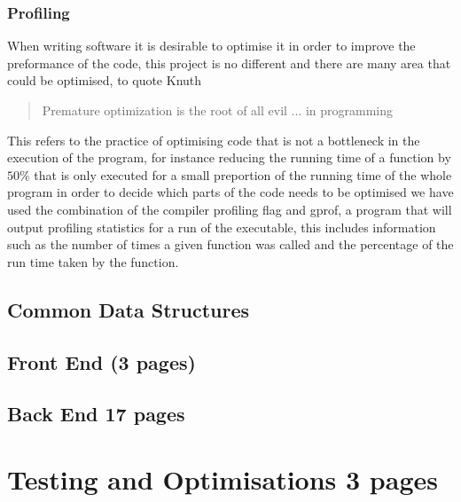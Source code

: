 \subsection{Profiling}
When writing software it is desirable to optimise it in order to improve the preformance of the code, this project
is no different and there are many area that could be optimised, to quote Knuth

\begin{quotation}
{Premature optimization is the root of all evil ... in programming \cite{Knuth74a}}
\end{quotation}

This refers to the practice of optimising code that is not a bottleneck in the execution of the program, for instance
reducing the running time of a function by $50\%$ that is only executed for a small preportion of the running time of
the whole program in order to decide which parts of the code needs to be optimised we have used the combination of
the compiler profiling flag and gprof, a program that will output profiling statistics for a run of the executable,
this includes information such as the number of times a given function was called and the percentage of the run time
taken by the function.

\newpage
\section{Common Data Structures}

\newpage
\section{Front End (3 pages)}

\newpage
\section{Back End 17 pages}

\newpage
\chapter{Testing and Optimisations 3 pages}


